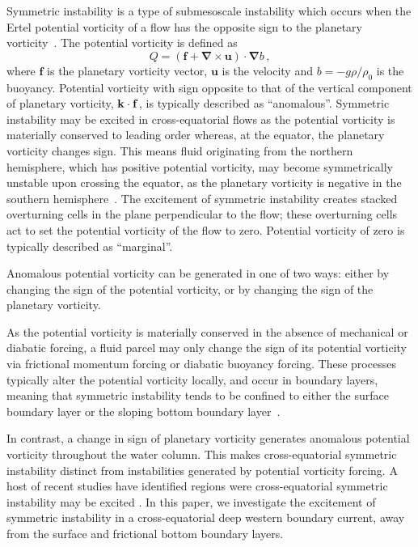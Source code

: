Symmetric instability is a type of submesoscale instability which occurs when the Ertel potential vorticity of a flow has the opposite sign to the planetary vorticity~\cite{Stone1966, Hoskins1974}.  The potential vorticity is defined as
\begin{equation}
    Q = (\mathbf{f} + \mathbf{\nabla} \times \mathbf{u}) \cdot \mathbf{\nabla}b \, ,
\end{equation}
where $\mathbf{f}$ is the planetary vorticity vector, $\mathbf{u}$ is the velocity and $b = - g \rho / \rho_0$ is the buoyancy. Potential vorticity with sign opposite to that of the vertical component of planetary vorticity, ${\bf k} \cdot {\bf f}$, is typically described as ``anomalous''. Symmetric instability may be excited in cross-equatorial flows as the potential vorticity is materially conserved to leading order whereas, at the equator, the planetary vorticity changes sign. This means fluid originating from the northern hemisphere, which has positive potential vorticity, may become symmetrically unstable upon crossing the equator, as the planetary vorticity is negative in the southern hemisphere~\cite{Goldsworth2021a}. The excitement of symmetric instability creates stacked overturning cells in the plane perpendicular to the flow; these overturning cells act to set the potential vorticity of the flow to zero. Potential vorticity of zero is typically described as ``marginal''.

Anomalous potential vorticity can be generated in one of two ways: either by changing the sign of the potential vorticity, or by changing the sign of the planetary vorticity. 

As the potential vorticity is materially conserved in the absence of mechanical or diabatic forcing, a fluid parcel may only change the sign of its potential vorticity via frictional momentum forcing or diabatic buoyancy forcing. These processes typically alter the potential vorticity locally, and occur in boundary layers, meaning that symmetric instability tends to be confined to either the surface boundary layer or the sloping bottom boundary layer~\cite{Haine1998, Wenegrat2020}. 

In contrast, a change in sign of planetary vorticity generates anomalous potential vorticity throughout the water column. This makes cross-equatorial symmetric instability distinct from instabilities generated by potential vorticity forcing. A host of recent studies have identified regions were cross-equatorial symmetric instability may be excited \cite{Jakoboski2022, Goldsworth2021a, Forryan2021, Zhou2022}. In this paper, we  investigate the excitement of symmetric instability in a cross-equatorial deep western boundary current, away from the surface and frictional bottom boundary layers.

